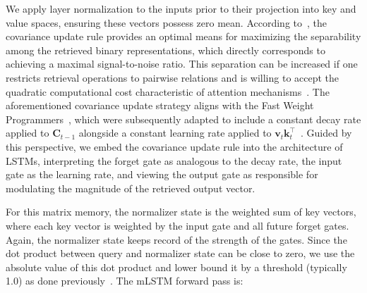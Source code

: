 We apply layer normalization to the inputs prior to their projection into key and value spaces, ensuring these vectors possess zero mean. According to~\citep{Dayan:91}, the covariance update rule provides an optimal means for maximizing the separability among the retrieved binary representations, which directly corresponds to achieving a maximal signal-to-noise ratio. This separation can be increased if one restricts retrieval operations to pairwise relations and is willing to accept the quadratic computational cost characteristic of attention mechanisms~\citep{Krotov:16,Krotov:17,Ramsauer:21}. The aforementioned covariance update strategy aligns with the Fast Weight Programmers~\citep{Schmidhuber:92ncfastweights,Schlag:21}, which were subsequently adapted to include a constant decay rate applied to $\mathbf{C}_{t-1}$ alongside a constant learning rate applied to 
$\mathbf{v}_{t} \mathbf{k}_t ^\top$~\citep{Ba:16}. Guided by this perspective, we embed the covariance update rule into the architecture of LSTMs, interpreting the forget gate as analogous to the decay rate, the input gate as the learning rate, and viewing the output gate as responsible for modulating the magnitude of the retrieved output vector.

For this matrix memory, the normalizer state is the weighted sum of key vectors, where each key vector is weighted by the input gate and all future forget gates. Again, the normalizer state keeps record of the strength of the gates. Since the dot product between query and normalizer state can be close to zero, we use the absolute value of this dot product and lower bound it by a threshold (typically 1.0) as done previously~\citep{Sun:23arxiv}. The mLSTM forward pass is:

